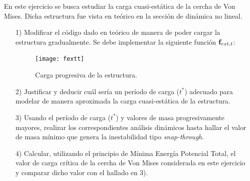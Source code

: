 
\bigskip
\begin{exercise}
	
	En este ejercicio se busca estudiar la carga cuasi-estática de la cercha de Von Mises. Dicha estructura fue vista en teórico en la sección de dinámica no lineal.
	
	\begin{itemize}
		\item[1)] Modificar el código dado en teórico de manera de poder cargar la estructura gradualmente. Se debe implementar la siguiente función ${\bf f}_{ext,t}$:
		
		\begin{figure}[htb]
			\centering
			\texttt{[image: fextt]}
			\caption{Carga progresiva de la estructura.}
			\label{fig:fextt}
		\end{figure}
		
		\item[2)] Justificar y deducir cuál sería un período de carga ($t^*$) adecuado para modelar de manera aproximada la carga cuasi-estática de la estructura.
		
		\item[3)] Usando el período de carga ($t^*$) y valores de masa progresivamente mayores, realizar los correspondientes análisis dinámicos hasta hallar el valor de masa mínimo que genera la inestabilidad tipo \textit{snap-through}.
		
		\item[4)] Calcular, utilizando el principio de Mínima Energía Potencial Total, el valor de carga crítica de la cercha de Von Mises considerada en este ejercicio y comparar dicho valor con el hallado en 3).
	\end{itemize}
\end{exercise}	

